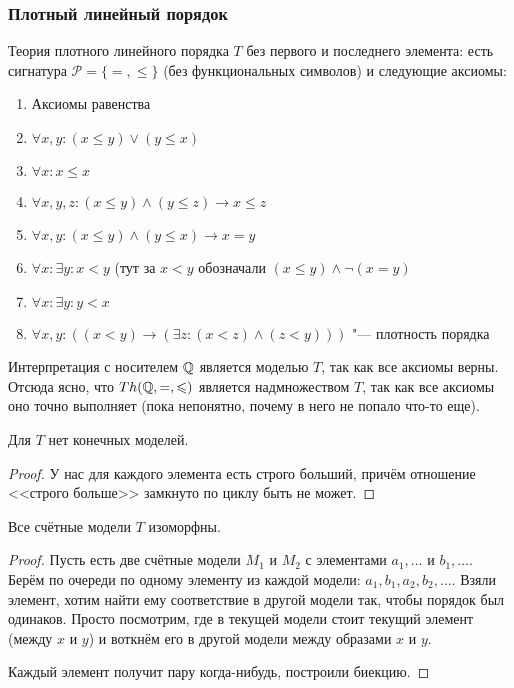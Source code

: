 \subsubsection{Плотный линейный порядок}
\begin{Def}
	Теория плотного линейного порядка $T$ без первого и последнего элемента:
	есть сигнатура $\mathcal{P}=\{ =, \le \}$ (без функциональных символов) и следующие аксиомы:
	\begin{enumerate}
		\item Аксиомы равенства
		\item $\forall x, y \colon (x \le y) \lor (y \le x)$
		\item $\forall x \colon x \le x$
		\item $\forall x, y, z \colon (x \le y) \land (y \le z) \to x \le z$
		\item $\forall x, y \colon (x \le y) \land (y \le x) \to x = y$
		\item $\forall x \colon \exists y \colon x < y$ (тут за $x < y$ обозначали $(x \le y) \land \lnot (x = y)$
		\item $\forall x \colon \exists y \colon y < x$
		\item $\forall x, y \colon ((x < y) \to (\exists z \colon (x < z) \land (z < y)))$ "--- плотность порядка
	\end{enumerate}
\end{Def}
\begin{Rem}
	Интерпретация с носителем $\mathbb{Q}$ является моделью $T$, так как все аксиомы верны.
	Отсюда ясно, что $Th(\mathbb{Q}, =, \leqslant)$ является надмножеством $T$, так как все аксиомы оно точно
	выполняет (пока непонятно, почему в него не попало что-то еще).
\end{Rem}
\begin{assertion}
	Для $T$ нет конечных моделей.
\end{assertion}
\begin{proof}
	У нас для каждого элемента есть строго больший, причём отношение <<строго больше>> замкнуто по циклу быть не может.
\end{proof}
\begin{assertion}
	Все счётные модели $T$ изоморфны.
\end{assertion}
\begin{proof}
	Пусть есть две счётные модели $M_1$ и $M_2$ с элементами $a_1, \dots$ и $b_1, \dots$.
	Берём по очереди по одному элементу из каждой модели: $a_1, b_1, a_2, b_2, \dots$.
	Взяли элемент, хотим найти ему соответствие в другой модели так, чтобы порядок был одинаков.
	Просто посмотрим, где в текущей модели стоит текущий элемент (между $x$ и $y$) и
	воткнём его в другой модели между образами $x$ и $y$.

	Каждый элемент получит пару когда-нибудь, построили биекцию.
\end{proof}
